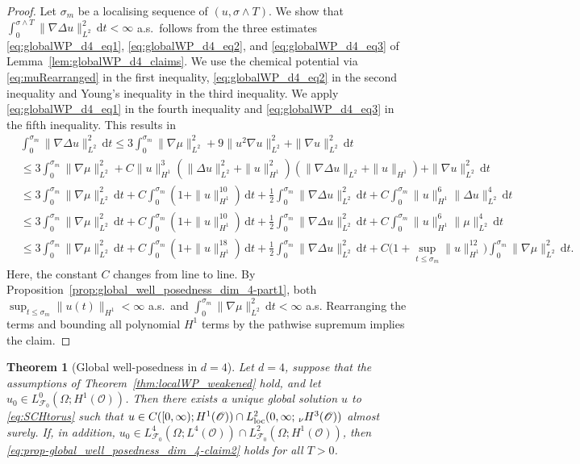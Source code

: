 \documentclass[reqno]{amsart}
\newtheorem{theorem}[Satz]{Theorem}
\newcommand{\F}{\mathscr{F}}
\newcommand{\sO}{\mathscr{O}}
\newcommand{\1}{\mathbf{1}}
\newcommand{\grad}{\nabla}
\newcommand{\dt}{\,\mathrm{d}t}
\newcommand{\loc}{\textup{loc}}
\newcommand{\nH}{\ensuremath{\,_\nu H}}
\begin{document}
\begin{proof}
Let $\sigma_m$ be a localising sequence of $(u,\sigma\wedge T)$. We show that $\int_0^{\sigma\wedge T} \|\grad \Delta u\|^2_{L^2} \dt <\infty$ a.s.\ follows from the three estimates \eqref{eq:globalWP_d4_eq1}, \eqref{eq:globalWP_d4_eq2}, and \eqref{eq:globalWP_d4_eq3} of Lemma~\ref{lem:globalWP_d4_claims}.
We use the chemical potential via \eqref{eq:muRearranged} in the first inequality, \eqref{eq:globalWP_d4_eq2} in the second inequality and Young's inequality in the third inequality. We apply \eqref{eq:globalWP_d4_eq1} in the fourth inequality and
\eqref{eq:globalWP_d4_eq3} in the fifth inequality. This results in
\begin{align*}
    & \int_0^{\sigma_m} \|\nabla\Delta u\|_{L^2}^2\dt 
     \le 3\int_0^{\sigma_m} \|\nabla\mu\|_{L^2}^2
    + 9\|u^2\nabla u\|_{L^2}^2
    + \|\nabla u\|_{L^2}^2\dt  \\
    & \le 
    3\int_0^{\sigma_m}
    \|\nabla\mu\|_{L^2}^2
    +
    C\|u\|^3_{H^1}
    \left(\|\Delta u\|_{L^2}^2
    +\|u\|^2_{H^1}  \right)
    \left( \|\grad \Delta u\|_{L^2} +\|u\|_{H^1}\right)+
    \|\nabla u\|_{L^2}^2\dt\\
    & \le  
    3\int_0^{\sigma_m}
    \|\nabla\mu\|_{L^2}^2 \dt +
    C\int_0^{\sigma_m}(1+\|u\|_{H^1}^{10})\dt
    +
    \frac12
    \int_0^{\sigma_m}
    \|\nabla\Delta u\|_{L^2}^2\dt
    +
    C\int_0^{\sigma_m}
    \|u\|_{H^1}^6
    \|\Delta u\|_{L^2}^4\dt  \\
    & \le
    3\int_0^{\sigma_m}
    \|\nabla\mu\|_{L^2}^2 \dt +
    C\int_0^{\sigma_m}(1+\|u\|_{H^1}^{10})\dt
    +
    \frac12
    \int_0^{\sigma_m}
    \|\nabla\Delta u\|_{L^2}^2\dt
    +
    C\int_0^{\sigma_m}
    \|u\|_{H^1}^6
    \|\mu\|_{L^2}^4\dt \\
    & \le
    3\int_0^{\sigma_m}
    \|\nabla\mu\|_{L^2}^2 \dt +
    C\int_0^{\sigma_m}(1+\|u\|_{H^1}^{18})\dt
    +
    \frac12
    \int_0^{\sigma_m}
    \|\nabla\Delta u\|_{L^2}^2\dt
     + C\Big(1+ \sup_{t\leq \sigma_m} \|u\|^{12}_{H^1} \Big)
    \int_0^{\sigma_m}
    \|\nabla\mu\|_{L^2}^2\dt.
 \end{align*}
Here, the constant $C$ changes from line to line. By Proposition~\ref{prop:global_well_posedness_dim_4-part1}, both $\sup_{t\le \sigma_m} \|u(t)\|_{H^1}<\infty$ a.s.\ and $\int_0^{\sigma_m} \|\grad \mu\|_{L^2}^2\dt<\infty$ a.s. Rearranging the terms and bounding all polynomial $H^1$ terms by the pathwise supremum implies the claim.
\end{proof}

\begin{theorem}[Global well-posedness in $d=4$] \label{thm:global_well_posedness_dim_4-complete}
	Let $d=4$, suppose that the assumptions of Theorem~\ref{thm:localWP_weakened} hold, and let $u_0\in L^0_{\F_0}(\Omega;H^1(\sO))$. Then there exists a unique global solution $u$ to \eqref{eq:SCHtorus} such that $u\in C([0,\infty);H^1(\sO))\cap L_{\loc}^2(0,\infty;\nH^3(\sO))$ almost surely. If, in addition, $u_0\in L_{\F_0}^4(\Omega;L^4(\sO))\cap L_{\F_0}^2(\Omega;H^1(\sO))$, then \eqref{eq:prop-global_well_posedness_dim_4-claim2} holds for all $T>0$. 
\end{theorem}
\end{document}
